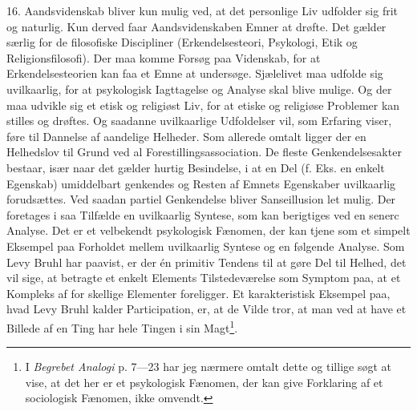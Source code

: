 \documentclass[12pt]{article}
\newcommand{\opage}[1]{\marginnote{\footnotesize\textit{[#1]}}}
\begin{document}
\opage{48}16. Aandsvidenskab bliver kun mulig ved, at det personlige Liv
udfolder sig frit og naturlig. Kun derved faar Aandsvidenskaben Emner
at drøfte. Det gælder særlig for de filosofiske Discipliner
(Erkendelsesteori, Psykologi, Etik og Religionsfilosofi). Der maa
komme Forsøg paa Videnskab, for at Erkendelsesteorien kan faa et Emne
at undersøge. Sjælelivet maa udfolde sig uvilkaarlig, for at
psykologisk Iagttagelse og Analyse skal blive mulige. Og der maa
udvikle sig et etisk og religiøst Liv, for at etiske og religiøse
Problemer kan stilles og drøftes. Og saadanne uvilkaarlige Udfoldelser
vil, som Erfaring viser, føre til Dannelse af aandelige Helheder. Som
allerede omtalt ligger der en Helhedslov til Grund ved al
Forestillingsassociation. De fleste Genkendelsesakter bestaar, især
naar det gælder hurtig Besindelse, i at en Del (f. Eks. en enkelt
Egenskab) umiddelbart genkendes og Resten af Emnets Egenskaber
uvilkaarlig forudsættes. Ved saadan partiel Genkendelse bliver
Sanseillusion let mulig. Der foretages i saa Tilfælde en uvilkaarlig
Syntese, som kan berigtiges ved en
senerc Analyse. Det er et velbekendt psykologisk Fænomen, der kan
tjene som et simpelt Eksempel paa Forholdet mellem uvilkaarlig Syntese
og en følgende Analyse. Som Levy Bruhl har paavist, er der
én primitiv Tendens til at gøre Del til Helhed, det vil sige, at
betragte et enkelt Elements Tilstedeværelse som Symptom paa, at et
Kompleks af for%
\setcounter{footnote}{0}%
\opage{49}skellige Elementer foreligger. Et karakteristisk Eksempel paa,
hvad Levy Bruhl kalder Participation, er, at de Vilde tror, at man ved
at have et Billede af en Ting har hele Tingen i sin
Magt\footnote{I \textit{Begrebet Analogi} p. 7---23 har jeg nærmere
omtalt dette og tillige søgt at vise, at det her er et psykologisk
Fænomen, der kan give Forklaring af et sociologisk Fænomen, ikke
omvendt.}.
\end{document}
